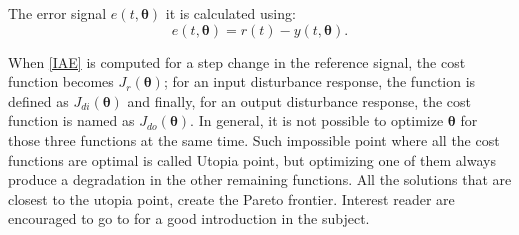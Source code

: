\begin{refsection}
The error signal $e(t, \bm{\theta})$ it is calculated using:
%
\begin{equation}  %
e(t,\bm{\theta})=r(t)-y(t,\bm{\theta}).
\label{error}
\end{equation}

When \eqref{IAE} is computed for a step change in the reference signal, the cost function becomes $J_r(\bm{\theta})$; for an input disturbance response, the function is defined as $J_{di}(\bm{\theta})$ and finally, for an output disturbance response, the cost function is named as $J_{do}(\bm{\theta})$. In general, it is not possible to optimize $\bm{\theta}$ for those three functions at the same time. Such impossible point where all the cost functions are optimal is called Utopia point, but optimizing one of them always produce a degradation in the other remaining functions. All the solutions that are closest to the utopia point, create the Pareto frontier. %
Interest reader are encouraged to go to \textcite{Marler2004} for a good introduction in the subject.

%


\end{refsection}
